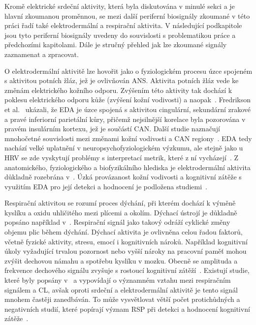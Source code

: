 Kromě elektrické srdeční aktivity, která byla diskutována v minulé sekci a je
hlavní zkoumanou proměnnou, se mezi další periferní biosignály zkoumané v této
práci řadí také elektrodermální a respirační aktivita. V následující podkapitole
jsou tyto periferní biosignály uvedeny do souvislosti s problematikou práce a
předchozími kapitolami. Dále je stručný přehled jak lze zkoumané signály
zaznamenat a zpracovat.

O elektrodermální aktivitě lze hovořit jako o fyziologickém procesu úzce
spojeném s aktivitou potních žláz, jež je ovlivňován \gls{ANS}. Aktivita potních
žláz vede ke změnám elektrického kožního odporu. Zvýšením této aktivity tak
dochází k poklesu elektrického odporu kůže (zvýšení kožní vodivosti) a
naopak~\cite{Boucsein2012,Critchley2002,Tronstad2022}. Fredrikson et
al.~\cite{Fredrikson1998} ukázali, že EDA je úzce spojená s aktivitou
cingulární, sekundární zrakové a pravé inferiorní parietální kůry, přičemž
nejsilnější korelace byla pozorována v pravém insulárním kortexu, jež je
součástí \gls{CAN}. Další studie naznačují mnohočetné souvislosti mezi změnami
kožní vodivosti a \gls{CAN}
regiony~\cite{Critchley2002,Buchwald2019,Caruelle2019,Sanchez2020}. EDA tedy
nachází velké uplatnění v neuropsychofyziologickém výzkumu, ale stejně jako u
HRV se zde vyskytují problémy s interpretací metrik, které z ní
vycházejí~\cite{Blechert2016}. Z anatomického, fyziologického a biofyzikálního
hlediska je elektrodermální aktivita důkladně rozebrána v~\cite{Boucsein2012}.
Úzká provázanost kožní vodivosti a kognitivní zátěže s využitím EDA pro její
detekci a hodnocení je podložena
studiemi~\cite{Bahauddin2021,Ghaderyan2018,Hossain2019,
Nourbakhsh2012,Paas2003,Posada2018,Shi2007,Shimomura2008}.

Respirační aktivitou se rozumí proces dýchání, při kterém dochází k výměně
kyslíku a oxidu uhličitého mezi plícemi a okolím. Dýchací ústrojí je důkladně
popsáno například v~\cite{Kara2010}. Respirační signál jako takový odráží
cyklické změny objemu plic během dýchání. Dýchací aktivita je ovlivněna celou
řadou faktorů, včetně fyzické aktivity, stresu, emocí i kognitivních nároků.
Například kognitivní úkoly vyžadující trvalou pozornost nebo vyšší nároky na
pracovní paměť mohou zvýšit dechovou námahu a spotřebu kyslíku v mozku. Obecně
se amplituda a frekvence dechového signálu zvyšuje s rostoucí kognitivní
zátěží~\cite{Ayres2021}. Existují studie, které byly popsány
v~\cite{Grassmann2016} a vypovídají o významném vztahu mezi respiračním signálem
a \gls{CL}, avšak oproti srdeční a elektrodermální aktivitě je tento signál
mnohem častěji zanedbáván. To může vysvětlovat větší počet protichůdných a
negativních studií, které popírají význam RSP při detekci a hodnocení kognitivní
zátěže~\cite{Ayres2021,Grassmann2016}.


